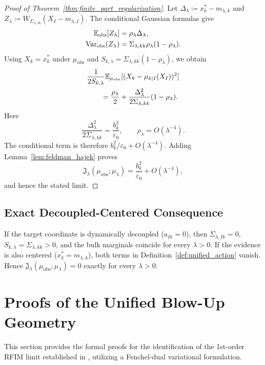 \begin{proof}[Proof of Theorem~\ref{thm:finite_part_regularization}]
Let $\Delta_\lambda\coloneqq x_k^*-m_{\lambda,k}$ and
$Z_\lambda\coloneqq W_{\Sigma_{\lambda,Ik}}(X_I-m_{\lambda,I})$.
The conditional Gaussian formulas give
\begin{align}
  \mathbb{E}_{\mathrm{obs}}[Z_\lambda]
    &=\rho_\lambda\Delta_\lambda, \\
  \operatorname{Var}_{\mathrm{obs}}(Z_\lambda)
    &=\Sigma_{\lambda,kk}\rho_\lambda(1-\rho_\lambda).
\end{align}
Using $X_k=x_k^*$ under $\mu_{\mathrm{obs}}$ and
$S_{k,\lambda}=\Sigma_{\lambda,kk}(1-\rho_\lambda)$, we obtain
\begin{align}
  &\frac{1}{2S_{k,\lambda}}
   \mathbb{E}_{\mu_{\mathrm{obs}}}
   [(X_k-\mu_{k|I}(X_I))^2] \nonumber\\
  &\qquad =
  \frac{\rho_\lambda}{2}
  +\frac{\Delta_\lambda^2}{2\Sigma_{\lambda,kk}}
   (1-\rho_\lambda).
\end{align}
Here
\[
  \frac{\Delta_\lambda^2}{2\Sigma_{\lambda,kk}}
  =\frac{b_k^2}{\varepsilon_0},
  \qquad \rho_\lambda=O(\lambda^{-4}).
\]
The conditional term is therefore
$b_k^2/\varepsilon_0+O(\lambda^{-4})$. Adding
Lemma~\ref{lem:feldman_hajek} proves
\[
  \mathfrak{J}_\lambda(\mu_{\mathrm{obs}};\mu_\lambda)
  =\frac{b_k^2}{\varepsilon_0}+O(\lambda^{-4}),
\]
and hence the stated limit.
\end{proof}

\subsection{Exact Decoupled-Centered Consequence}

If the target coordinate is dynamically decoupled ($a_{Ik}=0$), then
$\Sigma_{\lambda,Ik}=0$, $S_{k,\lambda}=\Sigma_{\lambda,kk}>0$, and the
bulk marginals coincide for every $\lambda>0$. If the evidence is also
centered ($x_k^*=m_{\lambda,k}$), both terms in
Definition~\ref{def:unified_action} vanish. Hence
$\mathfrak{J}_\lambda(\mu_{\mathrm{obs}};\mu_\lambda)=0$ exactly for every
$\lambda>0$.



\section{Proofs of the Unified Blow-Up Geometry}
\label{sec:appendix:proofs}
\label{sec:formal:proofs}

This section provides the formal proofs for the identification of the 1st-order RFIM limit established in , utilizing a Fenchel-dual variational formulation.

